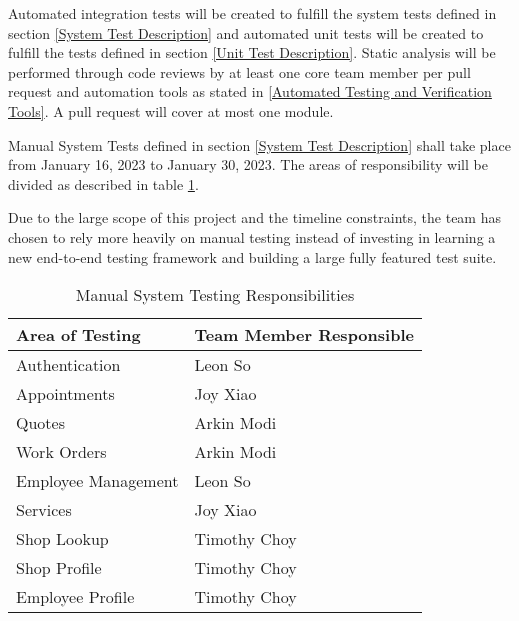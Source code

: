 \documentclass[12pt, titlepage]{article}
\begin{document}
Automated integration tests will be created to fulfill the system tests defined in section
\ref{System Test Description} and automated unit tests will be created to fulfill the tests defined
in section \ref{Unit Test Description}. Static analysis will be performed through code reviews by
at least one core team member per pull request and automation tools as stated in \ref{Automated
	Testing and Verification Tools}. A pull request will cover at most one module.

Manual System Tests defined in section \ref{System Test Description} shall take place from January
16, 2023 to January 30, 2023. The areas of responsibility will be divided as described in table
\ref{Manual System Testing Responsibilities}.

Due to the large scope of this project and the timeline constraints, the team has chosen to rely
more heavily on manual testing instead of investing in learning a new end-to-end testing framework
and building a large fully featured test suite.

\begin{table}[H]
	\centering
	\caption{Manual System Testing Responsibilities}
	\vspace{5pt}
	\begin{tabular}{|p{}|p{}|}
		\hline
		\textbf{Area of Testing} & \textbf{Team Member Responsible} \\
		\hline
		Authentication           & Leon So                          \\
		\hline
		Appointments             & Joy Xiao                         \\
		\hline
		Quotes                   & Arkin Modi                       \\
		\hline
		Work Orders              & Arkin Modi                       \\
		\hline
		Employee Management      & Leon So                          \\
		\hline
		Services                 & Joy Xiao                         \\
		\hline
		Shop Lookup              & Timothy Choy                     \\
		\hline
		Shop Profile             & Timothy Choy                     \\
		\hline
		Employee Profile         & Timothy Choy                     \\
		\hline
	\end{tabular}

	\label{Manual System Testing Responsibilities}
\end{table}
\end{document}

